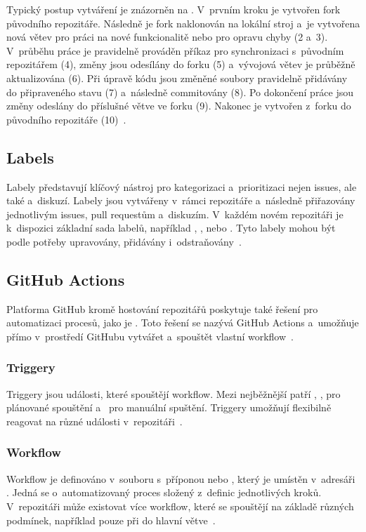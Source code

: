 Typický postup vytváření \PR je znázorněn na . V~prvním kroku je vytvořen fork původního repozitáře. Následně je fork naklonován na lokální stroj a~je vytvořena nová větev pro práci na nové funkcionalitě nebo pro opravu chyby (2 a~3). V~průběhu práce je pravidelně prováděn příkaz  pro synchronizaci s~původním repozitářem (4), změny jsou odesílány do forku (5) a~vývojová větev je průběžně aktualizována (6). Při úpravě kódu jsou změněné soubory pravidelně přidávány do připraveného stavu (7) a~následně commitovány (8). Po dokončení práce jsou změny odeslány do příslušné větve ve forku (9). Nakonec je vytvořen \PR{} z~forku do původního repozitáře (10)~\cite{psl_git_tutorial_main}.

\subsection{Labels}
\label{subsec:github:labels}
Labely představují klíčový nástroj pro kategorizaci a~prioritizaci nejen issues, ale také \PR a~diskuzí. Labely jsou vytvářeny v~rámci repozitáře a~následně přiřazovány jednotlivým issues, pull requestům a~diskuzím. V~každém novém repozitáři je k~dispozici základní sada labelů, například , ,  nebo . Tyto labely mohou být podle potřeby upravovány, přidávány i~odstraňovány~\cite{github_issues_docs}.

\subsection{GitHub Actions}
\label{subsec:github:actions}
Platforma GitHub kromě hostování repozitářů poskytuje také řešení pro automatizaci procesů, jako je \CICD{}. Toto řešení se nazývá GitHub Actions a~umožňuje přímo v~prostředí GitHubu vytvářet a~spouštět vlastní workflow~\cite{github_actions_docs}.

\subsubsection*{Triggery}
\label{subsubsec:github:actions_triggery}
Triggery jsou události, které spouštějí workflow. Mezi nejběžnější patří , ,  pro plánované spouštění a~ pro manuální spuštění. Triggery umožňují flexibilně reagovat na různé události v~repozitáři~\cite{github_actions_docs}.

\subsubsection*{Workflow}
\label{subsubsec:github:actions_workflow}
Workflow je definováno v~souboru s~příponou  nebo , který je umístěn v~adresáři . Jedná se o~automatizovaný proces složený z~definic jednotlivých kroků. V~repozitáři může existovat více workflow, které se spouštějí na základě různých podmínek, například pouze při  do hlavní větve~\cite{github_actions_docs}.


